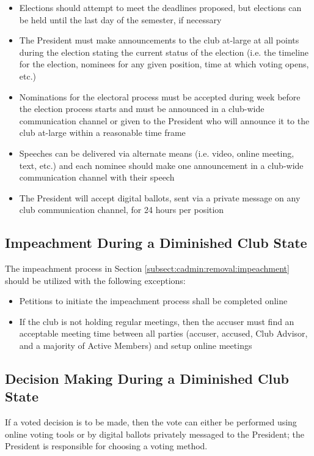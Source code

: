\documentclass[english,11pt]{article}
\begin{document}
\begin{itemize}
    \item Elections should attempt to meet the deadlines proposed, but elections can be held until the last day of the semester, if necessary
    \item The President must make announcements to the club at-large at all points during the election stating the current status of the election (i.e. the timeline for the election, nominees for any given position, time at which voting opens, etc.)
    \item Nominations for the electoral process must be accepted during week before the election process starts and must be announced in a club-wide communication channel or given to the President who will announce it to the club at-large within a reasonable time frame
    \item Speeches can be delivered via alternate means (i.e. video, online meeting, text, etc.) and each nominee should make one announcement in a club-wide communication channel with their speech 
    \item The President will accept digital ballots, sent via a private message on any club communication channel, for 24 hours per position
\end{itemize}

\subsection{Impeachment During a Diminished Club State} \label{subsect:reduced:impeachment}
The impeachment process in Section \ref{subsect:cadmin:removal:impeachment} should be utilized with the following exceptions:

\begin{itemize}
    \item Petitions to initiate the impeachment process shall be completed online
    \item If the club is not holding regular meetings, then the accuser must find an acceptable meeting time between all parties (accuser, accused, Club Advisor, and a majority of Active Members) and setup online meetings
\end{itemize}

\subsection{Decision Making During a Diminished Club State} \label{subsect:reduced:decisions}
If a voted decision is to be made, then the vote can either be performed using online voting tools or by digital ballots privately messaged to the President; the President is responsible for choosing a voting method.
\end{document}
